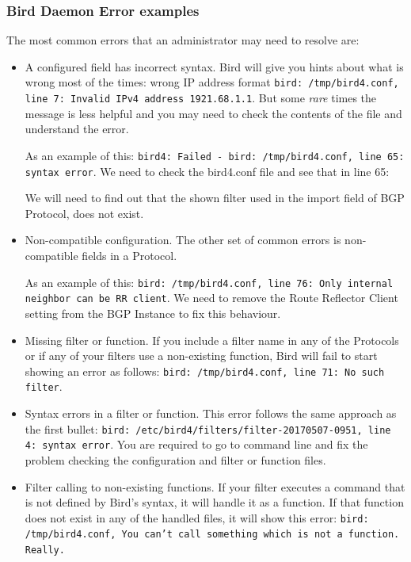 \subsubsection{Bird Daemon Error examples}
The most common errors that an administrator may need to resolve are:

\begin{itemize}
\item A configured field has incorrect syntax.
Bird will give you hints about what is wrong most of the times: wrong IP address format \texttt{bird: /tmp/bird4.conf, line 7: Invalid IPv4 address 1921.68.1.1}. But some \textit{rare} times the message is less helpful and you may need to check the contents of the file and understand the error.

As an example of this: \texttt{bird4: Failed - bird: /tmp/bird4.conf, line 65: syntax error}. We need to check the bird4.conf file and see that in line 65:



We will need to find out that the shown filter used in the import field of BGP Protocol, does not exist.

\item Non-compatible configuration.
The other set of common errors is non-compatible fields in a Protocol.

As an example of this: \texttt{bird: /tmp/bird4.conf, line 76: Only internal neighbor can be RR client}. We need to remove the Route Reflector Client setting from the BGP Instance to fix this behaviour.

\item Missing filter or function.
If you include a filter name in any of the Protocols or if any of your filters use a non-existing function, Bird will fail to start showing an error as follows: \texttt{bird: /tmp/bird4.conf, line 71: No such filter}.

\item Syntax errors in a filter or function.
This error follows the same approach as the first bullet: \texttt{bird: /etc/bird4/filters/filter-20170507-0951, line 4: syntax error}. You are required to go to command line and fix the problem checking the configuration and filter or function files.

\item Filter calling to non-existing functions.
If your filter executes a command that is not defined by Bird's syntax, it will handle it as a function. If that function does not exist in any of the handled files, it will show this error: \texttt{bird: /tmp/bird4.conf, You can't call something which is not a function. Really.}


\end{itemize}
